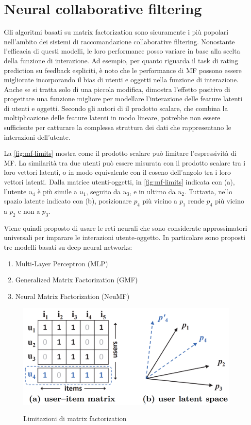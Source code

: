 \section{Neural collaborative filtering} \label{sec:ncf}
Gli algoritmi basati su matrix factorization sono sicuramente i più popolari nell'ambito dei sistemi di raccomandazione collaborative filtering. Nonostante l'efficacia di questi modelli, le loro performance  posso variare in base alla scelta della funzione di interazione. Ad esempio, per quanto riguarda il task di rating prediction su feedback espliciti, è noto che le performance di MF possono essere migliorate incorporando il bias di utenti e oggetti nella funzione di interazione. Anche se si tratta solo di una piccola modifica, dimostra l'effetto positivo di progettare una funzione migliore per modellare l'interazione delle feature latenti di utenti e oggetti. 
Secondo gli autori di \cite{NCF} il prodotto scalare, che combina la moltiplicazione delle feature latenti in modo lineare, potrebbe non essere sufficiente per catturare la complessa struttura dei dati che rappresentano le interazioni dell'utente. 

La \autoref{fig:mf-limits} mostra come il prodotto scalare può limitare l'espressività di MF. La similarità tra due utenti può essere misurata con il prodotto scalare tra i loro vettori latenti, o in modo equivalente con il coseno dell'angolo tra i loro vettori latenti. Dalla matrice utenti-oggetti, in \autoref{fig:mf-limits} indicata con (a), l'utente $u_4$ è più simile a $u_1$, seguito da $u_3$, e in ultimo da $u_2$. Tuttavia, nello spazio latente indicato con (b), posizionare $p_4$ più vicino a $p_1$ rende $p_4$ più vicino a $p_2$ e non a $p_3$.

Viene quindi proposto di usare le reti neurali che sono considerate approssimatori universali \cite{NN-universal-approx} per imparare le interazioni utente-oggetto. In particolare sono proposti tre modelli basati su deep neural networks:
\begin{enumerate}
 \item Multi-Layer Perceptron (MLP)
 \item Generalized Matrix Factorization (GMF)
 \item Neural Matrix Factorization (NeuMF)
\end{enumerate}

\begin{figure}
  \centering
  \includegraphics[scale=0.60]{immagini/user_item_vectors.png}
  \caption{Limitazioni di matrix factorization}
  \cite{NCF}
  \label{fig:mf-limits}
\end{figure}

